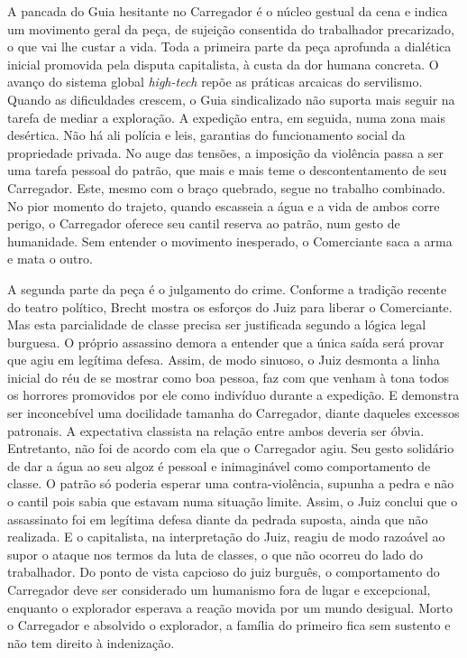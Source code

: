 A pancada do Guia hesitante no Carregador é o núcleo gestual da cena e
indica um movimento geral da peça, de sujeição consentida do trabalhador
precarizado, o que vai lhe custar a vida. Toda a primeira parte da peça
aprofunda a dialética inicial promovida pela disputa capitalista, à
custa da dor humana concreta. O avanço do sistema global \textit{high-tech}
repõe as práticas arcaicas do servilismo. Quando as dificuldades
crescem, o Guia sindicalizado não suporta mais seguir na tarefa de
mediar a exploração. A expedição entra, em seguida, numa zona mais
desértica. Não há ali polícia e leis, garantias do funcionamento social
da propriedade privada. No auge das tensões, a imposição da violência
passa a ser uma tarefa pessoal do patrão, que mais e mais teme o
descontentamento de seu Carregador. Este, mesmo com o braço quebrado,
segue no trabalho combinado. No pior momento do trajeto, quando
escasseia a água e a vida de ambos corre perigo, o Carregador oferece
seu cantil reserva ao patrão, num gesto de humanidade. Sem entender o
movimento inesperado, o Comerciante saca a arma e mata o outro.

A segunda parte da peça é o julgamento do crime. Conforme a tradição
recente do teatro político, Brecht mostra os esforços do Juiz para
liberar o Comerciante. Mas esta parcialidade de classe precisa ser
justificada segundo a lógica legal burguesa. O próprio assassino demora
a entender que a única saída será provar que agiu em legítima defesa.
Assim, de modo sinuoso, o Juiz desmonta a linha inicial do réu de se
mostrar como boa pessoa, faz com que venham à tona todos os horrores
promovidos por ele como indivíduo durante a expedição. E demonstra ser
inconcebível uma docilidade tamanha do Carregador, diante daqueles
excessos patronais. A expectativa classista na relação entre ambos
deveria ser óbvia. Entretanto, não foi de acordo com ela que o
Carregador agiu. Seu gesto solidário de dar a água ao seu algoz é
pessoal e inimaginável como comportamento de classe. O patrão só poderia
esperar uma contra-violência, supunha a pedra e não o cantil pois sabia
que estavam numa situação limite. Assim, o Juiz conclui que o
assassinato foi em legítima defesa diante da pedrada suposta, ainda que
não realizada. E o capitalista, na interpretação do Juiz, reagiu de modo
razoável ao supor o ataque nos termos da luta de classes, o que não
ocorreu do lado do trabalhador. Do ponto de vista capcioso do juiz
burguês, o comportamento do Carregador deve ser considerado um humanismo
fora de lugar e excepcional, enquanto o explorador esperava a reação
movida por um mundo desigual. Morto o Carregador e absolvido o
explorador, a família do primeiro fica sem sustento e não tem direito à
indenização.


